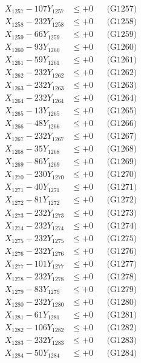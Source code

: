\documentclass[a4paper,10pt]{article}
\begin{document}
{\begin{align}
X_{1257} - 107Y_{1257} &\leq +0 && \text{(G1257)} \\
X_{1258} - 232Y_{1258} &\leq +0 && \text{(G1258)} \\
X_{1259} - 66Y_{1259} &\leq +0 && \text{(G1259)} \\
X_{1260} - 93Y_{1260} &\leq +0 && \text{(G1260)} \\
\allowbreak
X_{1261} - 59Y_{1261} &\leq +0 && \text{(G1261)} \\
X_{1262} - 232Y_{1262} &\leq +0 && \text{(G1262)} \\
X_{1263} - 232Y_{1263} &\leq +0 && \text{(G1263)} \\
X_{1264} - 232Y_{1264} &\leq +0 && \text{(G1264)} \\
X_{1265} - 13Y_{1265} &\leq +0 && \text{(G1265)} \\
X_{1266} - 48Y_{1266} &\leq +0 && \text{(G1266)} \\
X_{1267} - 232Y_{1267} &\leq +0 && \text{(G1267)} \\
X_{1268} - 35Y_{1268} &\leq +0 && \text{(G1268)} \\
X_{1269} - 86Y_{1269} &\leq +0 && \text{(G1269)} \\
X_{1270} - 230Y_{1270} &\leq +0 && \text{(G1270)} \\
\allowbreak
X_{1271} - 40Y_{1271} &\leq +0 && \text{(G1271)} \\
X_{1272} - 81Y_{1272} &\leq +0 && \text{(G1272)} \\
X_{1273} - 232Y_{1273} &\leq +0 && \text{(G1273)} \\
X_{1274} - 232Y_{1274} &\leq +0 && \text{(G1274)} \\
X_{1275} - 232Y_{1275} &\leq +0 && \text{(G1275)} \\
X_{1276} - 232Y_{1276} &\leq +0 && \text{(G1276)} \\
X_{1277} - 101Y_{1277} &\leq +0 && \text{(G1277)} \\
X_{1278} - 232Y_{1278} &\leq +0 && \text{(G1278)} \\
X_{1279} - 83Y_{1279} &\leq +0 && \text{(G1279)} \\
X_{1280} - 232Y_{1280} &\leq +0 && \text{(G1280)} \\
\allowbreak
X_{1281} - 61Y_{1281} &\leq +0 && \text{(G1281)} \\
X_{1282} - 106Y_{1282} &\leq +0 && \text{(G1282)} \\
X_{1283} - 232Y_{1283} &\leq +0 && \text{(G1283)} \\
X_{1284} - 50Y_{1284} &\leq +0 && \text{(G1284)} \\

\end{align}}
\end{document}
